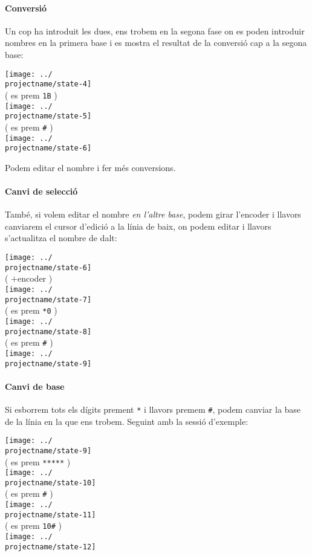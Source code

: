 \paragraph{Conversió} Un cop ha introduit les dues, ens trobem en la segona fase on es poden introduir
nombres en la primera base i es mostra el resultat de la conversió cap a la segona base:

\begin{center}
  \texttt{[image: ../\\projectname/state-4]} \\
  ( es prem \texttt{1B} ) \\
  \texttt{[image: ../\\projectname/state-5]} \\
  ( es prem \texttt{\#} ) \\
  \texttt{[image: ../\\projectname/state-6]}
\end{center}

Podem editar el nombre i fer més conversions.

\paragraph{Canvi de selecció} També, si volem editar el nombre
\emph{en l'altre base}, podem girar l'encoder i llavors canviarem el cursor
d'edició a la línia de baix, on podem editar i llavors s'actualitza el nombre de dalt:

\begin{center}
  \texttt{[image: ../\\projectname/state-6]} \\
  ( $+$encoder ) \\
  \texttt{[image: ../\\projectname/state-7]} \\
  ( es prem \texttt{*0} ) \\
  \texttt{[image: ../\\projectname/state-8]} \\
  ( es prem \texttt{\#} ) \\
  \texttt{[image: ../\\projectname/state-9]}
\end{center}

\paragraph{Canvi de base} Si esborrem tots els dígits prement \texttt{*} i llavors premem \texttt{\#},
podem canviar la base de la línia en la que ens trobem. Seguint amb la sessió d'exemple:

\begin{center}
  \texttt{[image: ../\\projectname/state-9]} \\
  ( es prem \texttt{*****} ) \\
  \texttt{[image: ../\\projectname/state-10]} \\
  ( es prem \texttt{\#} ) \\
  \texttt{[image: ../\\projectname/state-11]} \\
  ( es prem \texttt{10\#} ) \\
  \texttt{[image: ../\\projectname/state-12]}
\end{center}

